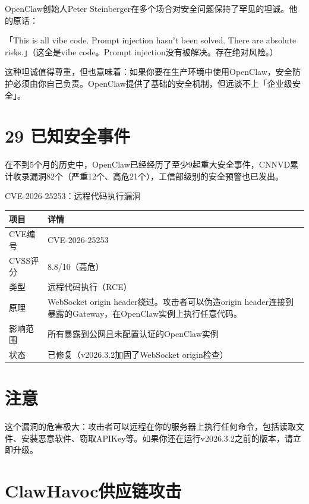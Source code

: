 \documentclass[
  10
]{article}
\newcounter{none} %
\begin{document}
OpenClaw创始人Peter
Steinberger在多个场合对安全问题保持了罕见的坦诚。他的原话：

「This is all vibe code. Prompt injection hasn't been solved. There are
absolute risks.」（这全是vibe code。Prompt
injection没有被解决。存在绝对风险。）

这种坦诚值得尊重，但也意味着：如果你要在生产环境中使用OpenClaw，安全防护必须由你自己负责。OpenClaw提供了基础的安全机制，但远谈不上「企业级安全」。

\section{29 已知安全事件}\label{ux5df2ux77e5ux5b89ux5168ux4e8bux4ef6}

在不到5个月的历史中，OpenClaw已经经历了至少9起重大安全事件，CNNVD累计收录漏洞82个（严重12个、高危21个），工信部级别的安全预警也已发出。

CVE-2026-25253：远程代码执行漏洞

{\def\LTcaptype{none} %
\begin{longtable}[]{@{}|l|l|@{}}
\toprule\noalign{}
\endhead
\bottomrule\noalign{}
\endlastfoot
\hline
项目 & 详情 \\
\hline
CVE编号 & CVE-2026-25253 \\
\hline
CVSS评分 & 8.8/10（高危） \\
\hline
类型 & 远程代码执行（RCE） \\
\hline
原理 & WebSocket origin header绕过。攻击者可以伪造origin
header连接到暴露的Gateway，在OpenClaw实例上执行任意代码。 \\
\hline
影响范围 & 所有暴露到公网且未配置认证的OpenClaw实例 \\
\hline
状态 & 已修复（v2026.3.2加固了WebSocket origin检查） \\
\hline
\end{longtable}
}

\section{注意}\label{ux6ce8ux610f-23}

这个漏洞的危害极大：攻击者可以远程在你的服务器上执行任何命令，包括读取文件、安装恶意软件、窃取APIKey等。如果你还在运行v2026.3.2之前的版本，请立即升级。

\section{ClawHavoc供应链攻击}\label{clawhavocux4f9bux5e94ux94feux653bux51fb-1}
\end{document}

